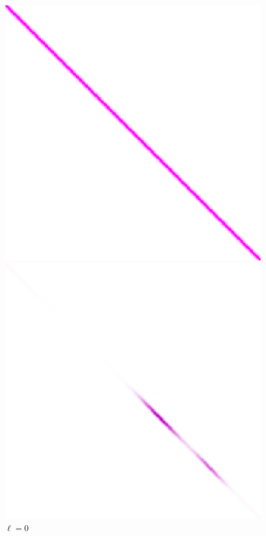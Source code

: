 \documentclass[cn,10pt,math=newtx,citestyle=gb7714-2015,bibstyle=gb7714-2015]{elegantbook}
\begin{document}
\begin{figure}[H]
	\centering
	\begin{minipage}{0.8\linewidth}
	\centering
	\begin{minipage}{0.16\linewidth}
		\centering
		\begin{mdframed}
		    \includegraphics[width=\linewidth]{figure/fig4.5/evol-img-1.eps}
		\end{mdframed}
		\caption*{$\ell=0$}
	\end{minipage}
	\begin{minipage}{0.16\linewidth}
		\centering
		\begin{mdframed}
		    \includegraphics[width=\linewidth]{figure/fig4.5/evol-img-2.eps}

\end{mdframed}
\end{minipage}
\end{minipage}
\end{figure}
\end{document}
